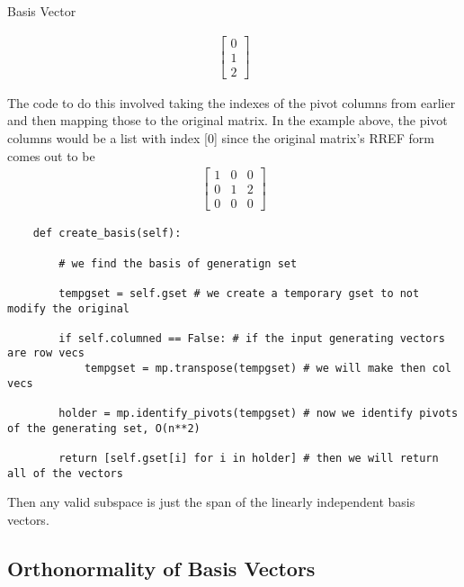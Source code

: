\documentclass[12pt, a4paper]{article}
\begin{document}
Basis Vector

\begin{eqnarray*}
    \begin{bmatrix}
        0 \\
        1 \\
        2
    \end{bmatrix}
\end{eqnarray*}

The code to do this involved taking the indexes of the pivot columns from earlier and then mapping those to the original matrix.
In the example above, the pivot columns would be a list with index [0] since the original matrix's RREF form comes out to be 
\begin{eqnarray}
    \begin{bmatrix}
        1 & 0 & 0 \\
        0 & 1 & 2 \\
        0 & 0 & 0
    \end{bmatrix}
\end{eqnarray}

\begin{lstlisting}
    def create_basis(self): 

        # we find the basis of generatign set

        tempgset = self.gset # we create a temporary gset to not modify the original

        if self.columned == False: # if the input generating vectors are row vecs
            tempgset = mp.transpose(tempgset) # we will make then col vecs

        holder = mp.identify_pivots(tempgset) # now we identify pivots of the generating set, O(n**2)

        return [self.gset[i] for i in holder] # then we will return all of the vectors
\end{lstlisting}

Then any valid subspace is just the span of the linearly independent basis vectors.

\subsection{Orthonormality of Basis Vectors}
\end{document}
